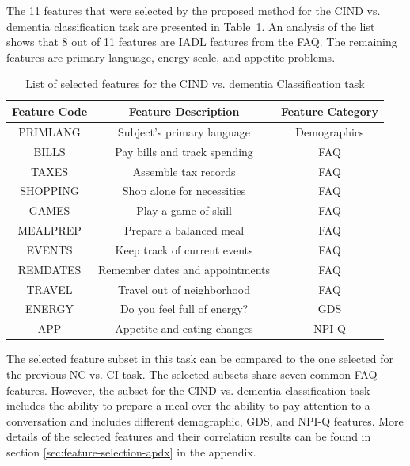 The 11 features that were selected by the proposed method for the CIND vs. dementia classification task are presented in Table~\ref{table:features-task2}. An analysis of the list shows that 8 out of 11 features are IADL features from the FAQ. The remaining features are primary language, energy scale, and appetite problems.

\begin{table}[h!]
\centering
\caption{List of selected features for the CIND vs. dementia Classification task}
\label{table:features-task2}
\begin{tabular}{ccc}
\toprule
\textbf{Feature Code} & \textbf{Feature Description} & \textbf{Feature Category} \\
\midrule
PRIMLANG & Subject's primary language & Demographics \\
BILLS & Pay bills and track spending & FAQ \\
TAXES & Assemble tax records & FAQ \\
SHOPPING & Shop alone for necessities & FAQ \\
GAMES & Play a game of skill & FAQ \\
MEALPREP & Prepare a balanced meal & FAQ \\ 
EVENTS & Keep track of current events & FAQ \\
REMDATES & Remember dates and appointments & FAQ \\
TRAVEL & Travel out of neighborhood & FAQ \\
ENERGY & Do you feel full of energy? & GDS \\
APP & Appetite and eating changes & NPI-Q \\
\bottomrule
\end{tabular}
\end{table}

The selected feature subset in this task can be compared to the one selected for the previous NC vs. CI task. The selected subsets share seven common FAQ features. However, the subset for the CIND vs. dementia classification task includes the ability to prepare a meal over the ability to pay attention to a conversation and includes different demographic, GDS, and NPI-Q features. More details of the selected features and their correlation results can be found in section \ref{sec:feature-selection-apdx} in the appendix.

